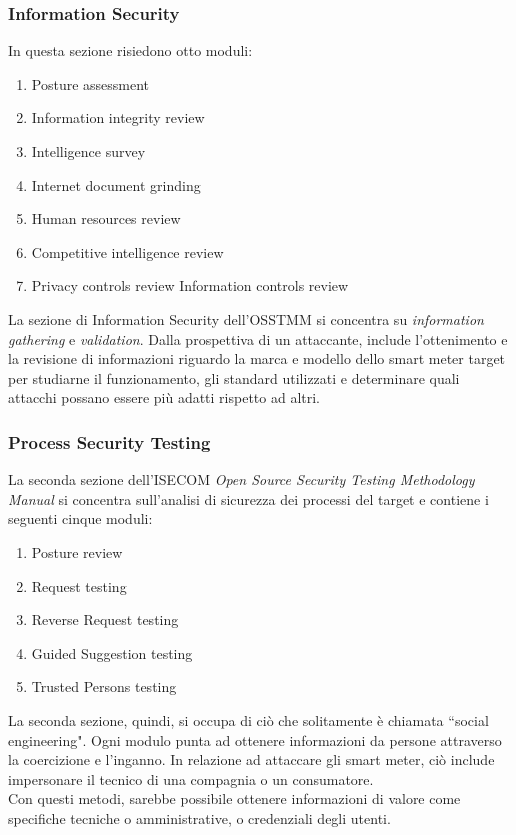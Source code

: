 \subsubsection{Information Security}
In questa sezione risiedono otto moduli:
\begin{enumerate}
	\item Posture assessment
	\item Information integrity review
	\item Intelligence survey
	\item Internet document grinding
	\item Human resources review
	\item Competitive intelligence review
	\item Privacy controls review
	Information controls review
\end{enumerate}
La sezione di Information Security dell'OSSTMM si concentra su \emph{information gathering} e \emph{validation}. Dalla prospettiva di un attaccante, include l'ottenimento e la revisione di informazioni riguardo la marca e modello dello smart meter target per studiarne il funzionamento, gli standard utilizzati e determinare quali attacchi possano essere più adatti rispetto ad altri.


\subsubsection{Process Security Testing}
La seconda sezione dell'ISECOM \emph{Open Source Security Testing Methodology Manual} si concentra sull'analisi di sicurezza dei processi del target e contiene i seguenti cinque moduli:
\begin{enumerate}
	\item Posture review
	\item Request testing
	\item Reverse Request testing
	\item Guided Suggestion testing
	\item Trusted Persons testing
\end{enumerate}

La seconda sezione, quindi, si occupa di ciò che solitamente è chiamata ``social engineering". Ogni modulo punta ad ottenere informazioni da persone attraverso la coercizione e l'inganno. In relazione ad attaccare gli smart meter, ciò include impersonare il tecnico di una compagnia o un consumatore.\\
Con questi metodi, sarebbe possibile ottenere informazioni di valore come specifiche tecniche o amministrative, o credenziali degli utenti.

